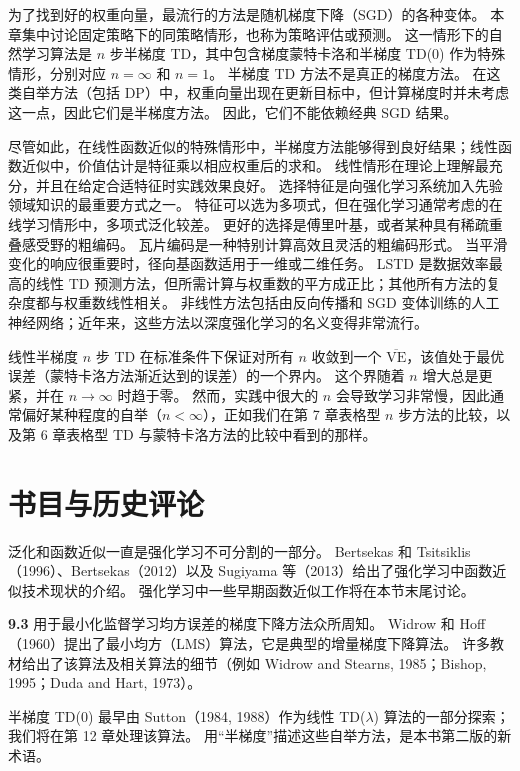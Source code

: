 \documentclass[UTF8,12pt,a4paper,fontset=fandol]{ctexart}
\begin{document}
为了找到好的权重向量，最流行的方法是随机梯度下降（SGD）的各种变体。
本章集中讨论固定策略下的同策略情形，也称为策略评估或预测。
这一情形下的自然学习算法是 $n$ 步半梯度 TD，其中包含梯度蒙特卡洛和半梯度 TD(0) 作为特殊情形，分别对应 $n=\infty$ 和 $n=1$。
半梯度 TD 方法不是真正的梯度方法。
在这类自举方法（包括 DP）中，权重向量出现在更新目标中，但计算梯度时并未考虑这一点，因此它们是半梯度方法。
因此，它们不能依赖经典 SGD 结果。

尽管如此，在线性函数近似的特殊情形中，半梯度方法能够得到良好结果；线性函数近似中，价值估计是特征乘以相应权重后的求和。
线性情形在理论上理解最充分，并且在给定合适特征时实践效果良好。
选择特征是向强化学习系统加入先验领域知识的最重要方式之一。
特征可以选为多项式，但在强化学习通常考虑的在线学习情形中，多项式泛化较差。
更好的选择是傅里叶基，或者某种具有稀疏重叠感受野的粗编码。
瓦片编码是一种特别计算高效且灵活的粗编码形式。
当平滑变化的响应很重要时，径向基函数适用于一维或二维任务。
LSTD 是数据效率最高的线性 TD 预测方法，但所需计算与权重数的平方成正比；其他所有方法的复杂度都与权重数线性相关。
非线性方法包括由反向传播和 SGD 变体训练的人工神经网络；近年来，这些方法以深度强化学习的名义变得非常流行。

线性半梯度 $n$ 步 TD 在标准条件下保证对所有 $n$ 收敛到一个 $\overline{\mathrm{VE}}$，该值处于最优误差（蒙特卡洛方法渐近达到的误差）的一个界内。
这个界随着 $n$ 增大总是更紧，并在 $n\to\infty$ 时趋于零。
然而，实践中很大的 $n$ 会导致学习非常慢，因此通常偏好某种程度的自举（$n<\infty$），正如我们在第 7 章表格型 $n$ 步方法的比较，以及第 6 章表格型 TD 与蒙特卡洛方法的比较中看到的那样。

\section*{书目与历史评论}

泛化和函数近似一直是强化学习不可分割的一部分。
Bertsekas 和 Tsitsiklis（1996）、Bertsekas（2012）以及 Sugiyama 等（2013）给出了强化学习中函数近似技术现状的介绍。
强化学习中一些早期函数近似工作将在本节末尾讨论。

\noindent\textbf{9.3}
用于最小化监督学习均方误差的梯度下降方法众所周知。
Widrow 和 Hoff（1960）提出了最小均方（LMS）算法，它是典型的增量梯度下降算法。
许多教材给出了该算法及相关算法的细节（例如 Widrow and Stearns, 1985；Bishop, 1995；Duda and Hart, 1973）。

半梯度 TD(0) 最早由 Sutton（1984, 1988）作为线性 TD($\lambda$) 算法的一部分探索；我们将在第 12 章处理该算法。
用“半梯度”描述这些自举方法，是本书第二版的新术语。
\end{document}
